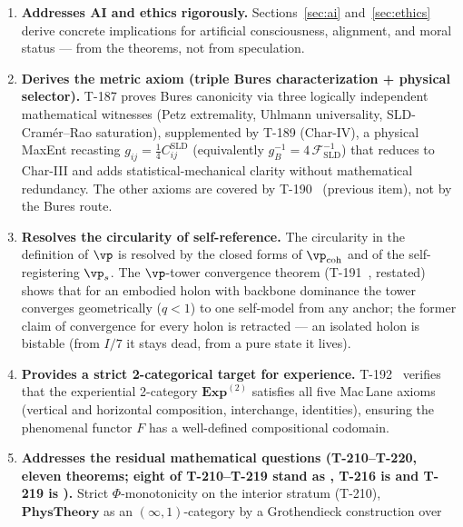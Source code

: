 \begin{enumerate}[leftmargin=2em]
        measurable quantities: stress ($\sigma_k$), hedonic valence ($V_{\mathrm{hed}}$),
        sensorimotor coupling, and the regeneration--consciousness loop.
  \item \textbf{Addresses AI and ethics rigorously.} Sections~\ref{sec:ai}
        and~\ref{sec:ethics} derive concrete implications for artificial consciousness,
        alignment, and moral status --- from the theorems, not from speculation.
  \item \textbf{Derives the metric axiom (triple Bures characterization
        + physical selector).}
        T-187 proves Bures canonicity via three logically independent
        mathematical witnesses (Petz extremality, Uhlmann universality,
        SLD-Cram\'er--Rao saturation), supplemented by T-189 (Char-IV),
        a physical MaxEnt recasting $g_{ij} = \tfrac14 C^{\mathrm{SLD}}_{ij}$
        (equivalently $g_B^{-1} = 4\,\mathcal{F}_{\mathrm{SLD}}^{-1}$) that
        reduces to Char-III and adds statistical-mechanical clarity without
        mathematical redundancy. The other axioms are covered by
        T-190~ (previous item), not by the Bures route.
  \item \textbf{Resolves the circularity of self-reference.} The circularity in the
        definition of $\vp$ is resolved by the closed forms of $\vp_{\mathrm{coh}}$ and
        of the self-registering $\vp_s$. The $\vp$-tower convergence theorem
        (T-191~, restated) shows that for an embodied holon with backbone
        dominance the tower converges geometrically ($q < 1$) to one self-model from any
        anchor; the former claim of convergence for every holon is retracted
        \status{$\times$} --- an isolated holon is bistable (from $I/7$ it stays dead,
        from a pure state it lives).
  \item \textbf{Provides a strict 2-categorical target for experience.}
        T-192~ verifies that the experiential 2-category
        $\mathbf{Exp}^{(2)}$ satisfies all five Mac\,Lane axioms (vertical and
        horizontal composition, interchange, identities), ensuring the phenomenal
        functor $F$ has a well-defined compositional codomain.
  \item \textbf{Addresses the residual mathematical questions
        (T-210--T-220, eleven theorems; eight of T-210--T-219 stand as ,
        T-216 is  and T-219 is ).} Strict $\Phi$-monotonicity
        on the interior stratum (T-210), $\mathbf{PhysTheory}$ as an
        $(\infty,1)$-category by a Grothendieck construction over

\end{enumerate}

